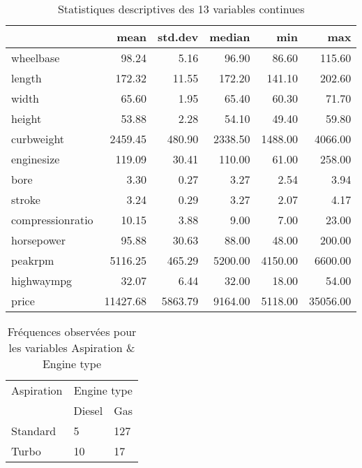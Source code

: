 \documentclass[12pt,a4paper,twoside]{article}
\begin{document}
\begin{table}[ht]
	\centering
	\begin{tabular}{lrrrrr}
		\hline
		& mean & std.dev & median & min & max \\ 
		\hline
		wheelbase & 98.24 & 5.16 & 96.90 & 86.60 & 115.60 \\ 
		length & 172.32 & 11.55 & 172.20 & 141.10 & 202.60 \\ 
		width & 65.60 & 1.95 & 65.40 & 60.30 & 71.70 \\ 
		height & 53.88 & 2.28 & 54.10 & 49.40 & 59.80 \\ 
		curbweight & 2459.45 & 480.90 & 2338.50 & 1488.00 & 4066.00 \\ 
		enginesize & 119.09 & 30.41 & 110.00 & 61.00 & 258.00 \\ 
		bore & 3.30 & 0.27 & 3.27 & 2.54 & 3.94 \\ 
		stroke & 3.24 & 0.29 & 3.27 & 2.07 & 4.17 \\ 
		compressionratio & 10.15 & 3.88 & 9.00 & 7.00 & 23.00 \\ 
		horsepower & 95.88 & 30.63 & 88.00 & 48.00 & 200.00 \\ 
		peakrpm & 5116.25 & 465.29 & 5200.00 & 4150.00 & 6600.00 \\ 
		highwaympg & 32.07 & 6.44 & 32.00 & 18.00 & 54.00 \\ 
		price & 11427.68 & 5863.79 & 9164.00 & 5118.00 & 35056.00 \\ 
		\hline
	\end{tabular}
\caption{Statistiques descriptives des 13 variables continues}
\label{table:desc}
\end{table}

\begin{table}[ht]
	\centering
	\begin{tabular}{l|ll}
	Aspiration	& \multicolumn{2}{c}{Engine type}  \\
		 & Diesel & Gas \\ 
		\hline
		Standard &   5 & 127 \\ 
		Turbo &  10 &  17 \\ 
		\hline
	\end{tabular}
\caption{Fréquences observées pour les variables Aspiration \& Engine type}
\label{table:freq}
\end{table}
\end{document}
